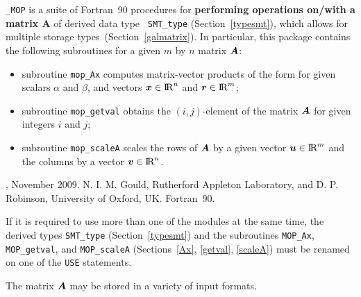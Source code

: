 \documentclass{galahad}
\newcommand{\packagename}{MOP}
\newcommand{\fullpackagename}{\libraryname\_\packagename}
\begin{document}
\galheader


\galsummary

{\tt \fullpackagename} is a suite of Fortran~90 procedures for
{\bf performing operations on/with a matrix $\mathbf{A}$} of derived data type {\tt
  SMT\_type} (Section~\ref{typesmt}), which allows for multiple storage
types~(Section~\ref{galmatrix}).  In particular, this package contains the following
subroutines for a given $m$ by $n$ matrix ${\bm{A}}$:
\begin{itemize}
  \item subroutine {\tt mop\_Ax} computes matrix-vector products of
    the form
    for given scalars $\alpha$ and $\beta$, and vectors ${\bm{x}}
    \in \hbox{I\hskip -1.5pt R}^n$ and ${\bm{r}} \in \hbox{I\hskip -1.5pt R}^m$;
  \item subroutine {\tt mop\_getval} obtains the $(i,j)$-element of
    the matrix ${\bm{A}}$ for given integers $i$ and $j$;
  \item subroutine {\tt mop\_scaleA} scales the rows of ${\bm{A}}$ by a
    given vector ${\bm{u}}\in\hbox{I\hskip -1.5pt R}^m$ and the columns by a vector ${\bm{v}}\in\hbox{I\hskip -1.5pt R}^n$.
\end{itemize}


\galattributes
\galversions{\tt  \fullpackagename\_single, \fullpackagename\_double},
\galdate November 2009.
\galorigin N. I. M. Gould, Rutherford Appleton Laboratory, and
D. P. Robinson, University of Oxford, UK.
\gallanguage Fortran~90. 


\galhowto



\noindent
If it is required to use more than one of the modules at the same time, 
the derived types
{\tt SMT\_type} (Section~\ref{typesmt}) 
and the subroutines 
{\tt \packagename\_Ax}, {\tt \packagename\_getval}, and 
{\tt \packagename\_scaleA} (Sections~\ref{Ax}, \ref{getval},
\ref{scaleA}) must be renamed on one of the {\tt USE} statements.


\galmatrix

The matrix ${\bm{A}}$ may be stored in a variety of input formats.
\end{document}
